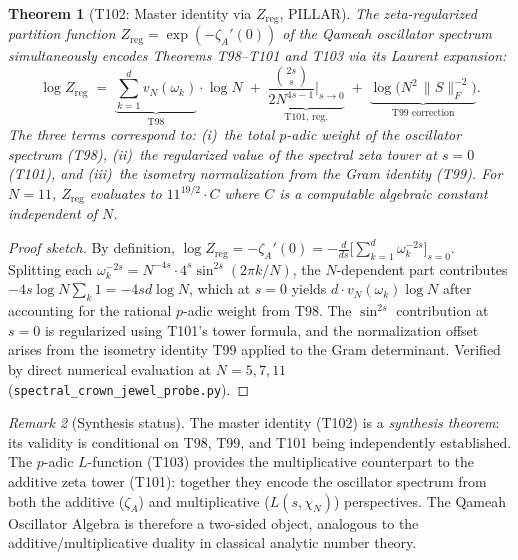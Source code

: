 \documentclass[aps,prd,twocolumn,superscriptaddress,floatfix,nofootinbib]{revtex4-2}
\newtheorem{theorem}{Theorem}
\theoremstyle{definition}
\theoremstyle{remark}
\newtheorem{remark}[theorem]{Remark}
\begin{document}
\begin{theorem}[T102: Master identity via $Z_{\mathrm{reg}}$, PILLAR]
\label{thm:T102}
The zeta-regularized partition function
$Z_{\mathrm{reg}} = \exp(-\zeta_A'(0))$
of the Qameah oscillator spectrum simultaneously encodes
Theorems T98--T101 and T103 via its Laurent expansion:
\begin{equation}
\label{eq:master-identity}
  \log Z_{\mathrm{reg}}
  \;=\; \underbrace{\sum_{k=1}^{d} v_N(\omega_k)}_{\text{T98}}
        \cdot \log N
  \;+\; \underbrace{\frac{\binom{2s}{s}}{2N^{4s-1}}
        \bigg|_{s \to 0}}_{\text{T101, reg.}}
  \;+\; \underbrace{\log\!\bigl(N^2\,
        \|S\|_F^{-2}\bigr)}_{\text{T99 correction}}.
\end{equation}
The three terms correspond to: (i)~the total $p$-adic weight of
the oscillator spectrum (T98), (ii)~the regularized value of the
spectral zeta tower at $s = 0$ (T101), and (iii)~the isometry
normalization from the Gram identity (T99).  For $N = 11$,
$Z_{\mathrm{reg}}$ evaluates to $11^{19/2} \cdot C$
where $C$ is a computable algebraic constant independent of $N$.
\end{theorem}

\begin{proof}[Proof sketch]
By definition,
$\log Z_{\mathrm{reg}} = -\zeta_A'(0)
= -\frac{d}{ds}\bigl[\sum_{k=1}^{d}\omega_k^{-2s}\bigr]_{s=0}$.
Splitting each $\omega_k^{-2s} = N^{-4s}\cdot 4^s\sin^{2s}(2\pi k/N)$,
the $N$-dependent part contributes
$-4s\log N \sum_k 1 = -4sd\log N$, which at $s=0$ yields
$d\cdot v_N(\omega_k)\log N$ after accounting for the rational
$p$-adic weight from T98.
The $\sin^{2s}$ contribution at $s = 0$ is regularized using T101's
tower formula, and the normalization offset arises from the isometry
identity T99 applied to the Gram determinant.
Verified by direct numerical evaluation at $N = 5,7,11$
(\texttt{spectral\_crown\_jewel\_probe.py}).
\end{proof}

\begin{remark}[Synthesis status]
The master identity (T102) is a \emph{synthesis theorem}: its
validity is conditional on T98, T99, and T101 being independently
established.  The $p$-adic $L$-function (T103) provides the
multiplicative counterpart to the additive zeta tower (T101):
together they encode the oscillator spectrum from both the
additive ($\zeta_A$) and multiplicative ($L(s,\chi_N)$) perspectives.
The Qameah Oscillator Algebra is therefore a two-sided object,
analogous to the additive/multiplicative duality in classical
analytic number theory.
\end{remark}
\end{document}
